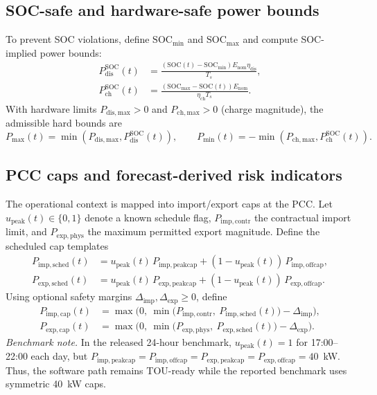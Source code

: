 \documentclass[preprint,12pt]{elsarticle}
\newcommand{\SOC}{\mathrm{SOC}}
\newcommand{\Ts}{T_s}
\begin{document}
\subsection{SOC-safe and hardware-safe power bounds}
To prevent SOC violations, define $\SOC_{\min}$ and $\SOC_{\max}$ and compute SOC-implied power bounds:
\begin{align}
P_{\mathrm{dis}}^{\SOC}(t) &= \frac{(\SOC(t)-\SOC_{\min})E_{\mathrm{nom}}\eta_{\mathrm{dis}}}{\Ts},\\
P_{\mathrm{ch}}^{\SOC}(t)   &= \frac{(\SOC_{\max}-\SOC(t))E_{\mathrm{nom}}}{\eta_{\mathrm{ch}}\Ts}.
\end{align}
With hardware limits $P_{\mathrm{dis,max}}>0$ and $P_{\mathrm{ch,max}}>0$ (charge magnitude),
the admissible hard bounds are
\begin{equation}
P_{\max}(t)=\min(P_{\mathrm{dis,max}},P_{\mathrm{dis}}^{\SOC}(t)),\qquad
P_{\min}(t)=-\min(P_{\mathrm{ch,max}},P_{\mathrm{ch}}^{\SOC}(t)).
\label{eq:hard_bounds}
\end{equation}

\subsection{PCC caps and forecast-derived risk indicators}
\label{subsec:pcc_risk}

The operational context is mapped into import/export caps at the PCC. Let $u_{\mathrm{peak}}(t)\in\{0,1\}$ denote a known schedule flag, $P_{\mathrm{imp,contr}}$ the contractual import limit, and $P_{\mathrm{exp,phys}}$ the maximum permitted export magnitude. Define the scheduled cap templates
\begin{align}
P_{\mathrm{imp,sched}}(t) &= u_{\mathrm{peak}}(t)\,P_{\mathrm{imp,peakcap}} + (1-u_{\mathrm{peak}}(t))\,P_{\mathrm{imp,offcap}},\\
P_{\mathrm{exp,sched}}(t) &= u_{\mathrm{peak}}(t)\,P_{\mathrm{exp,peakcap}} + (1-u_{\mathrm{peak}}(t))\,P_{\mathrm{exp,offcap}}.
\end{align}
Using optional safety margins $\Delta_{\mathrm{imp}},\Delta_{\mathrm{exp}}\ge 0$, define
\begin{align}
P_{\mathrm{imp,cap}}(t)
&= \max\!\Big(
0,\ \min\!\big(
P_{\mathrm{imp,contr}},
\ P_{\mathrm{imp,sched}}(t)
\big) - \Delta_{\mathrm{imp}}
\Big), \label{eq:pimp_cap}\\
P_{\mathrm{exp,cap}}(t)
&= \max\!\Big(
0,\ \min\!\big(
P_{\mathrm{exp,phys}},
\ P_{\mathrm{exp,sched}}(t)
\big) - \Delta_{\mathrm{exp}}
\Big). \label{eq:pexp_cap}
\end{align}
\textit{Benchmark note.} In the released 24-hour benchmark, $u_{\mathrm{peak}}(t)=1$ for 17:00--22:00 each day, but $P_{\mathrm{imp,peakcap}}=P_{\mathrm{imp,offcap}}=P_{\mathrm{exp,peakcap}}=P_{\mathrm{exp,offcap}}=40$~kW. Thus, the software path remains TOU-ready while the reported benchmark uses symmetric 40~kW caps.
\end{document}
